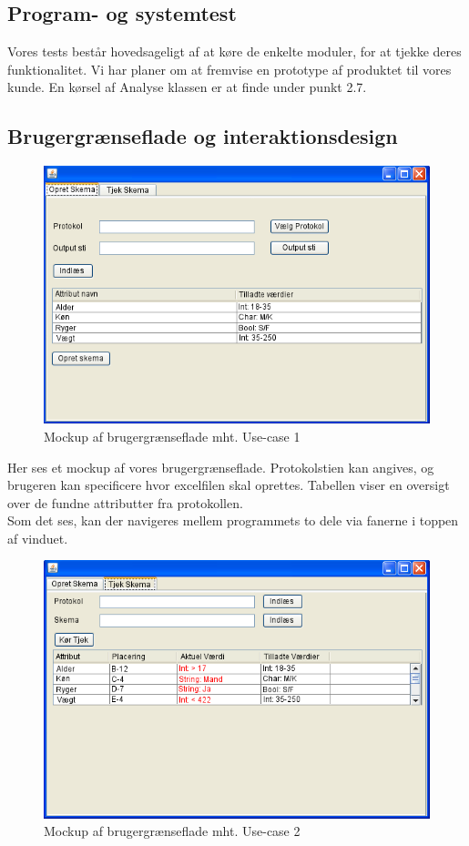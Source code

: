\documentclass[11pt]{article}
\begin{document}
\subsection{Program- og systemtest}
Vores tests består hovedsageligt af at køre de enkelte moduler, for at tjekke deres funktionalitet. Vi har planer om at fremvise en prototype af produktet til vores kunde. En kørsel af Analyse klassen er at finde under punkt 2.7.

\subsection{Brugergrænseflade og interaktionsdesign}
\begin{figure}[H]
\includegraphics[scale=1]{osm.png}
\caption{Mockup af brugergrænseflade mht. Use-case 1}
\end{figure}
Her ses et mockup af vores brugergrænseflade. Protokolstien kan angives, og brugeren kan specificere hvor excelfilen skal oprettes. Tabellen viser en oversigt over de fundne attributter fra protokollen.\\
Som det ses, kan der navigeres mellem programmets to dele via fanerne i toppen af vinduet.
\begin{figure}[H]
\includegraphics[scale=0.8]{mockup2.png}
\caption{Mockup af brugergrænseflade mht. Use-case 2}
\end{figure}
\end{document}
